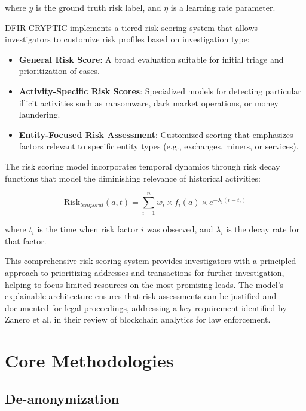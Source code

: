 \documentclass[conference]{IEEEtran}
\begin{document}
where $y$ is the ground truth risk label, and $\eta$ is a learning rate parameter.

DFIR CRYPTIC implements a tiered risk scoring system that allows investigators to customize risk profiles based on investigation type:

\begin{itemize}
    \item \textbf{General Risk Score}: A broad evaluation suitable for initial triage and prioritization of cases.
    
    \item \textbf{Activity-Specific Risk Scores}: Specialized models for detecting particular illicit activities such as ransomware, dark market operations, or money laundering.
    
    \item \textbf{Entity-Focused Risk Assessment}: Customized scoring that emphasizes factors relevant to specific entity types (e.g., exchanges, miners, or services).
\end{itemize}

The risk scoring model incorporates temporal dynamics through risk decay functions that model the diminishing relevance of historical activities:

\begin{equation}
\text{Risk}_{temporal}(a, t) = \sum_{i=1}^{n} w_i \times f_i(a) \times e^{-\lambda_i (t - t_i)}
\end{equation}

where $t_i$ is the time when risk factor $i$ was observed, and $\lambda_i$ is the decay rate for that factor.

This comprehensive risk scoring system provides investigators with a principled approach to prioritizing addresses and transactions for further investigation, helping to focus limited resources on the most promising leads. The model's explainable architecture ensures that risk assessments can be justified and documented for legal proceedings, addressing a key requirement identified by Zanero et al. \cite{zanero2022} in their review of blockchain analytics for law enforcement.

\section{Core Methodologies}

\subsection{De-anonymization}
\end{document}
